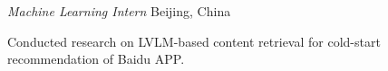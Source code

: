 \documentclass{resume}
\begin{document}


\textit{Machine Learning Intern}
\hfill Beijing, China

Conducted research on LVLM-based content retrieval for cold-start recommendation of Baidu APP.
\vspace{-0.5em}
\end{document}
